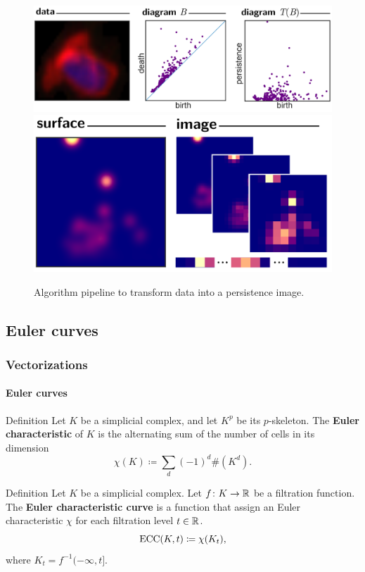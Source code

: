 \documentclass[aspectratio=169]{beamer}
\begin{document}
\begin{frame}
  \begin{figure}
      \centering
      \includegraphics[width=0.66\linewidth]{../figures/persistence-images-1.png}
      \includegraphics[width=0.44\linewidth]{../figures/persistence-images-2.png}
      \caption{Algorithm pipeline to transform data into a persistence image.}
    \end{figure}
\end{frame}

\subsection{Euler curves}

\begin{frame}
  \frametitle{Vectorizations}
  \framesubtitle{Euler curves}
  \begin{block}{Definition}
      Let $ K $ be a simplicial complex, and let $ K^p $ be its $p$-skeleton. The {\bf Euler characteristic} of $ K $ is the alternating sum of the number of cells in its dimension
      \begin{equation}
          \chi(K) \coloneq \sum_d (-1)^d \#(K^d).
      \end{equation}
  \end{block}
  \pause
  \begin{block}{Definition}
      Let $ K $ be a simplicial complex. Let $ f \colon K \to \mathbb R $ be a filtration function. The {\bf Euler characteristic curve} is a function that assign an Euler characteristic $ \chi $ for each filtration level $ t \in \mathbb R $. 
      \begin{equation}
          \operatorname{ECC}(K, t) \coloneq \chi(K_t),
      \end{equation}
      where $ K_t = f^{-1} (-\infty, t] $.
  \end{block}
\end{frame}
\end{document}
